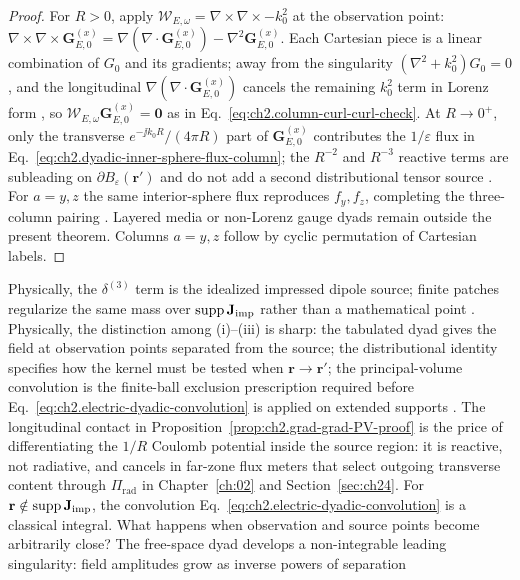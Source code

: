 \begin{proof}
For $R>0$, apply $\mathcal{W}_{E,\omega}=\nabla\times\nabla\times-k_0^{2}$ at the observation point:
$\nabla\times\nabla\times\mathbf{G}_{E,0}^{(x)}=\nabla(\nabla\cdot\mathbf{G}_{E,0}^{(x)})-\nabla^{2}\mathbf{G}_{E,0}^{(x)}$.
Each Cartesian piece is a linear combination of $G_0$ and its gradients; away from the singularity
$(\nabla^{2}+k_0^{2})G_0=0$, and the longitudinal $\nabla(\nabla\cdot\mathbf{G}_{E,0}^{(x)})$ cancels the
remaining $k_0^{2}$ term in Lorenz form \cite{tai1994,stratton1941}, so
$\mathcal{W}_{E,\omega}\mathbf{G}_{E,0}^{(x)}=\mathbf{0}$ as in Eq.~\eqref{eq:ch2.column-curl-curl-check}.
At $R\to 0^{+}$, only the transverse $e^{-\jj k_0 R}/(4\pi R)$ part of $\mathbf{G}_{E,0}^{(x)}$ contributes the
$1/\varepsilon$ flux in Eq.~\eqref{eq:ch2.dyadic-inner-sphere-flux-column}; the $R^{-2}$ and $R^{-3}$ reactive terms
are subleading on $\partial B_\varepsilon(\mathbf{r}')$ and do not add a second distributional tensor source
\cite{tai1994,jackson1999}. For $a=y,z$ the same interior-sphere flux reproduces $f_y,f_z$, completing the three-column
pairing \cite{tai1994}. Layered media or non-Lorenz gauge dyads remain outside the present theorem.
Columns $a=y,z$ follow by cyclic permutation of Cartesian labels.
\end{proof}
Physically, the $\delta^{(3)}$ term is the idealized impressed dipole source; finite patches regularize the same mass over
$\operatorname{supp}\mathbf{J}_{\mathrm{imp}}$ rather than a mathematical point \cite{stratton1941}.
Physically, the distinction among (i)--(iii) is sharp: the tabulated dyad gives the field at
observation points separated from the source; the distributional identity specifies how the kernel
must be tested when $\mathbf{r}\to\mathbf{r}'$; the principal-volume convolution is the
finite-ball exclusion prescription required before Eq.~\eqref{eq:ch2.electric-dyadic-convolution}
is applied on extended supports \cite{yaghjian1978,harrington2001}.
The longitudinal contact in Proposition~\ref{prop:ch2.grad-grad-PV-proof} is the price of differentiating the $1/R$ Coulomb potential
inside the source region: it is reactive, not radiative, and cancels in far-zone flux meters that select outgoing transverse content
through $\Pi_{\mathrm{rad}}$ in Chapter~\ref{ch:02} and Section~\ref{sec:ch24}.
For \(\mathbf{r}\notin\operatorname{supp}\mathbf{J}_{\mathrm{imp}}\), the convolution
Eq.~\eqref{eq:ch2.electric-dyadic-convolution} is a classical integral. What happens when
observation and source points become arbitrarily close? The free-space dyad develops a
non-integrable leading singularity: field amplitudes grow as inverse powers of separation
